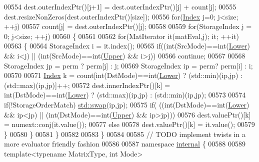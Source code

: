 \begin{DoxyCode}
00554     dest.outerIndexPtr()[j+1] = dest.outerIndexPtr()[j] + count[j];
00555   dest.resizeNonZeros(dest.outerIndexPtr()[size]);
00556   \textcolor{keywordflow}{for}(\hyperlink{namespace_eigen_a62e77e0933482dafde8fe197d9a2cfde}{Index} j=0; j<size; ++j)
00557     count[j] = dest.outerIndexPtr()[j];
00558   
00559   \textcolor{keywordflow}{for}(StorageIndex j = 0; j<size; ++j)
00560   \{
00561     
00562     \textcolor{keywordflow}{for}(MatIterator it(matEval,j); it; ++it)
00563     \{
00564       StorageIndex i = it.index();
00565       \textcolor{keywordflow}{if}((\textcolor{keywordtype}{int}(SrcMode)==\textcolor{keywordtype}{int}(\hyperlink{group__enums_gga39e3366ff5554d731e7dc8bb642f83cda891792b8ed394f7607ab16dd716f60e6}{Lower}) && i<j) || (\textcolor{keywordtype}{int}(SrcMode)==\textcolor{keywordtype}{int}(\hyperlink{group__enums_gga39e3366ff5554d731e7dc8bb642f83cda6bcb58be3b8b8ec84859ce0c5ac0aaec}{Upper}) && i>j))
00566         \textcolor{keywordflow}{continue};
00567                   
00568       StorageIndex jp = perm ? perm[j] : j;
00569       StorageIndex ip = perm? perm[i] : i;
00570       
00571       \hyperlink{namespace_eigen_a62e77e0933482dafde8fe197d9a2cfde}{Index} k = count[int(DstMode)==int(\hyperlink{group__enums_gga39e3366ff5554d731e7dc8bb642f83cda891792b8ed394f7607ab16dd716f60e6}{Lower}) ? (std::min)(ip,jp) : (std::max)(ip,jp)]++;
00572       dest.innerIndexPtr()[k] = int(DstMode)==int(\hyperlink{group__enums_gga39e3366ff5554d731e7dc8bb642f83cda891792b8ed394f7607ab16dd716f60e6}{Lower}) ? (std::max)(ip,jp) : (std::min)(ip,jp);
00573       
00574       \textcolor{keywordflow}{if}(!StorageOrderMatch) \hyperlink{endian_8c_a3ca5ecd34b04d6a243c054ac3a57f68d}{std::swap}(ip,jp);
00575       \textcolor{keywordflow}{if}( ((\textcolor{keywordtype}{int}(DstMode)==\textcolor{keywordtype}{int}(\hyperlink{group__enums_gga39e3366ff5554d731e7dc8bb642f83cda891792b8ed394f7607ab16dd716f60e6}{Lower}) && ip<jp) || (\textcolor{keywordtype}{int}(DstMode)==\textcolor{keywordtype}{int}(\hyperlink{group__enums_gga39e3366ff5554d731e7dc8bb642f83cda6bcb58be3b8b8ec84859ce0c5ac0aaec}{Upper}) && ip>jp)))
00576         dest.valuePtr()[k] = numext::conj(it.value());
00577       \textcolor{keywordflow}{else}
00578         dest.valuePtr()[k] = it.value();
00579     \}
00580   \}
00581 \}
00582 
00583 \}
00584 
00585 \textcolor{comment}{// TODO implement twists in a more evaluator friendly fashion}
00586 
00587 \textcolor{keyword}{namespace }\hyperlink{namespaceinternal}{internal} \{
00588 
00589 \textcolor{keyword}{template}<\textcolor{keyword}{typename} MatrixType, \textcolor{keywordtype}{int} Mode>

\end{DoxyCode}
